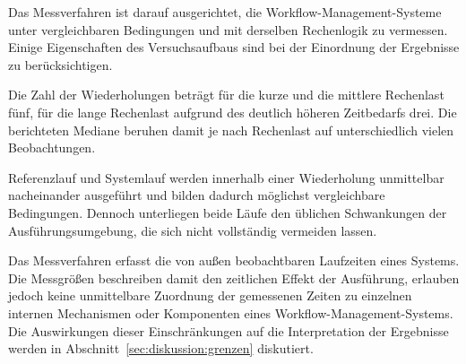 Das Messverfahren ist darauf ausgerichtet, die
Workflow-Management-Systeme unter vergleichbaren Bedingungen und
mit derselben Rechenlogik zu vermessen. Einige Eigenschaften des
Versuchsaufbaus sind bei der Einordnung der Ergebnisse zu
berücksichtigen.

Die Zahl der Wiederholungen beträgt für die kurze und die mittlere
Rechenlast fünf, für die lange Rechenlast aufgrund des deutlich
höheren Zeitbedarfs drei. Die berichteten Mediane beruhen damit je
nach Rechenlast auf unterschiedlich vielen Beobachtungen.

Referenzlauf und Systemlauf werden innerhalb einer Wiederholung
unmittelbar nacheinander ausgeführt und bilden dadurch möglichst
vergleichbare Bedingungen. Dennoch unterliegen beide Läufe den
üblichen Schwankungen der Ausführungsumgebung, die sich nicht
vollständig vermeiden lassen.

Das Messverfahren erfasst die von außen beobachtbaren Laufzeiten
eines Systems. Die Messgrößen beschreiben damit den zeitlichen
Effekt der Ausführung, erlauben jedoch keine unmittelbare Zuordnung
der gemessenen Zeiten zu einzelnen internen Mechanismen oder
Komponenten eines Workflow-Management-Systems. Die Auswirkungen
dieser Einschränkungen auf die Interpretation der Ergebnisse werden
in Abschnitt~\ref{sec:diskussion:grenzen} diskutiert.